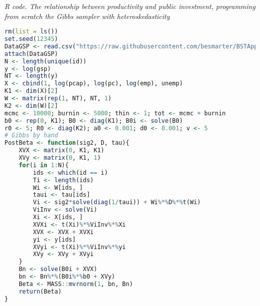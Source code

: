 \begin{enumerate}[leftmargin=*]
\begin{tcolorbox}[enhanced,width=4.67in,center upper,
	fontupper=\large\bfseries,drop shadow southwest,sharp corners]
	\textit{R code. The relationship between productivity and public investment, programming from scratch the Gibbs sampler with heteroskedasticity}
	\begin{VF}
		\begin{lstlisting}[language=R]
rm(list = ls())
set.seed(12345)
DataGSP <- read.csv("https://raw.githubusercontent.com/besmarter/BSTApp/refs/heads/master/DataApp/8PublicCap.csv", sep = ",", header = TRUE, quote = "")
attach(DataGSP)
N <- length(unique(id))
y <- log(gsp)
NT <- length(y)
X <- cbind(1, log(pcap), log(pc), log(emp), unemp)
K1 <- dim(X)[2]
W <- matrix(rep(1, NT), NT, 1)
K2 <- dim(W)[2]
mcmc <- 10000; burnin <- 5000; thin <- 1; tot <- mcmc + burnin
b0 <- rep(0, K1); B0 <- diag(K1); B0i <- solve(B0) 
r0 <- 5; R0 <- diag(K2); a0 <- 0.001; d0 <- 0.001; v <- 5
# Gibbs by hand
PostBeta <- function(sig2, D, tau){
	XVX <- matrix(0, K1, K1)
	XVy <- matrix(0, K1, 1)
	for(i in 1:N){
		ids <- which(id == i)
		Ti <- length(ids)
		Wi <- W[ids, ]
		taui <- tau[ids]
		Vi <- sig2*solve(diag(1/taui)) + Wi%*%D%*%t(Wi)
		ViInv <- solve(Vi)
		Xi <- X[ids, ]
		XVXi <- t(Xi)%*%ViInv%*%Xi
		XVX <- XVX + XVXi
		yi <- y[ids]
		XVyi <- t(Xi)%*%ViInv%*%yi
		XVy <- XVy + XVyi
	}
	Bn <- solve(B0i + XVX)
	bn <- Bn%*%(B0i%*%b0 + XVy)
	Beta <- MASS::mvrnorm(1, bn, Bn)
	return(Beta)
}
\end{lstlisting}
	\end{VF}
\end{tcolorbox}


\end{enumerate}
